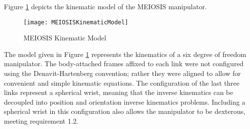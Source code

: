 Figure \ref{fig:MEIOSISKinematicModel} depicts the kinematic model of the MEIOSIS manipulator.

\begin{figure}[htp]
  \centering
  \texttt{[image: MEIOSISKinematicModel]}
  \caption{MEIOSIS Kinematic Model \cite{robo}}
  \label{fig:MEIOSISKinematicModel}
\end{figure}

The model given in Figure \ref{fig:MEIOSISKinematicModel} represents the kinematics of a six degree of freedom manipulator. The body-attached frames affixed to each link were not configured using the Denavit-Hartenberg convention; rather they were aligned to allow for convenient and simple kinematic equations. The configuration of the last three links represent a spherical wrist, meaning that the inverse kinematics can be decoupled into position and orientation inverse kinematics problems. Including a spherical wrist in this configuration also allows the manipulator to be dexterous, meeting requirement 1.2.
